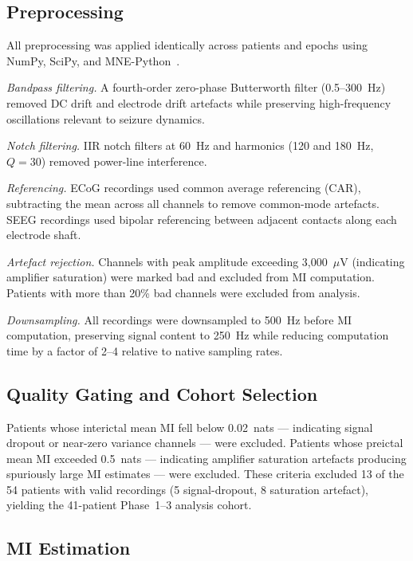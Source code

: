 \documentclass[final,5p,times,twocolumn]{elsarticle}
\begin{document}
\subsection{Preprocessing}

All preprocessing was applied identically across patients and epochs
using NumPy, SciPy, and MNE-Python~\cite{gramfort2013}.

\textit{Bandpass filtering.}
A fourth-order zero-phase Butterworth filter (0.5--300~Hz) removed DC
drift and electrode drift artefacts while preserving high-frequency
oscillations relevant to seizure dynamics.

\textit{Notch filtering.}
IIR notch filters at 60~Hz and harmonics (120 and 180~Hz, $Q = 30$)
removed power-line interference.

\textit{Referencing.}
ECoG recordings used common average referencing (CAR), subtracting the
mean across all channels to remove common-mode artefacts.
%
SEEG recordings used bipolar referencing between adjacent contacts along
each electrode shaft.

\textit{Artefact rejection.}
Channels with peak amplitude exceeding 3{,}000~$\mu$V (indicating
amplifier saturation) were marked bad and excluded from MI computation.
%
Patients with more than 20\% bad channels were excluded from analysis.

\textit{Downsampling.}
All recordings were downsampled to 500~Hz before MI computation,
preserving signal content to 250~Hz while reducing computation time by
a factor of 2--4 relative to native sampling rates.

\subsection{Quality Gating and Cohort Selection}
\label{sec:qc}

Patients whose interictal mean MI fell below 0.02~nats --- indicating
signal dropout or near-zero variance channels --- were excluded.
%
Patients whose preictal mean MI exceeded 0.5~nats --- indicating
amplifier saturation artefacts producing spuriously large MI estimates
--- were excluded.
%
These criteria excluded 13 of the 54 patients with valid recordings
(5 signal-dropout, 8 saturation artefact), yielding the 41-patient
Phase~1--3 analysis cohort.

\subsection{MI Estimation}
\end{document}
